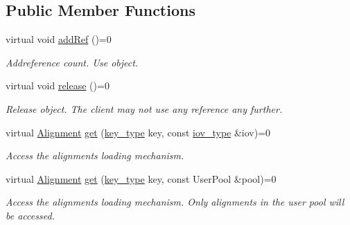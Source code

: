 \subsection*{Public Member Functions}
\begin{DoxyCompactItemize}
\item 
virtual void \hyperlink{class_d_d4hep_1_1_alignments_1_1_alignments_loader_a47a4586ac933395c27b705939985f41f}{addRef} ()=0
\begin{DoxyCompactList}\small\item\em Addreference count. Use object. \item\end{DoxyCompactList}\item 
virtual void \hyperlink{class_d_d4hep_1_1_alignments_1_1_alignments_loader_acebda57b7dc5288116e7162dda92b65e}{release} ()=0
\begin{DoxyCompactList}\small\item\em Release object. The client may not use any reference any further. \item\end{DoxyCompactList}\item 
virtual \hyperlink{class_d_d4hep_1_1_alignments_1_1_alignment}{Alignment} \hyperlink{class_d_d4hep_1_1_alignments_1_1_alignments_loader_a26866df09d8670f134fc0895444f1675}{get} (\hyperlink{class_d_d4hep_1_1_alignments_1_1_alignments_loader_af56e6294e72dacbe001c1f24b8381d5d}{key\_\-type} key, const \hyperlink{class_d_d4hep_1_1_i_o_v}{iov\_\-type} \&iov)=0
\begin{DoxyCompactList}\small\item\em Access the alignments loading mechanism. \item\end{DoxyCompactList}\item 
virtual \hyperlink{class_d_d4hep_1_1_alignments_1_1_alignment}{Alignment} \hyperlink{class_d_d4hep_1_1_alignments_1_1_alignments_loader_a19ca11e6b9485acd5797d509ea5b4b97}{get} (\hyperlink{class_d_d4hep_1_1_alignments_1_1_alignments_loader_af56e6294e72dacbe001c1f24b8381d5d}{key\_\-type} key, const UserPool \&pool)=0
\begin{DoxyCompactList}\small\item\em Access the alignments loading mechanism. Only alignments in the user pool will be accessed. \item\end{DoxyCompactList}\end{DoxyCompactItemize}
